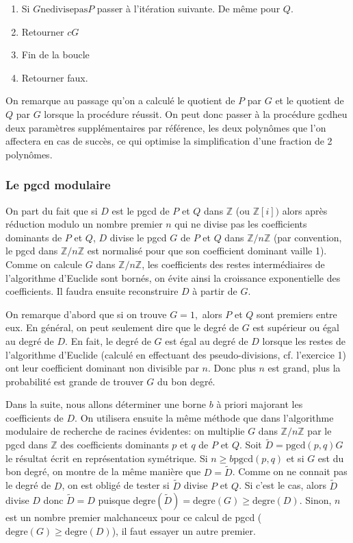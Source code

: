 \documentclass[a4paper,11pt]{article}
\begin{document}
\begin{giacjshere}
\begin{enumerate}
  \item Si $G \mbox{ne} \mbox{divise} \mbox{pas}$$P$ passer à l'itération
  suivante. De même pour $Q$.
  
  \item Retourner $c G$
  
  \item Fin de la boucle
  
  \item Retourner faux.
\end{enumerate}
On remarque au passage qu'on a calculé le quotient de $P$ par $G$ et le
quotient de $Q$ par $G$ lorsque la procédure réussit. On peut donc passer à la
procédure gcdheu deux paramètres supplémentaires par référence, les deux
polynômes que l'on affectera en cas de succès, ce qui optimise la
simplification d'une fraction de 2 polynômes.

\subsubsection{Le pgcd modulaire}

On part du fait que si $D$ est le pgcd de $P$ et $Q$ dans $\mathbb{Z}$ (ou
$\mathbb{Z} [ i ] )$ alors après réduction modulo un nombre premier $n$ qui ne
divise pas les coefficients dominants de $P$ et $Q$, $D$ divise le pgcd $G$ de
$P$ et $Q$ dans $\mathbb{Z} / n \mathbb{Z}$ (par convention, le pgcd dans
$\mathbb{Z} / n \mathbb{Z}$ est normalisé pour que son coefficient dominant
vaille 1). Comme on calcule $G$ dans $\mathbb{Z} / n \mathbb{Z}$, les
coefficients des restes intermédiaires de l'algorithme d'Euclide sont bornés,
on évite ainsi la croissance exponentielle des coefficients. Il faudra ensuite
reconstruire $D$ à partir de $G$.

On remarque d'abord que si on trouve $G = 1,$ alors $P$ et $Q$ sont premiers
entre eux. En général, on peut seulement dire que le degré de $G$ est
supérieur ou égal au degré de $D$. En fait, le degré de $G$ est égal au degré
de $D$ lorsque les restes de l'algorithme d'Euclide (calculé en effectuant des
pseudo-divisions, cf. l'exercice 1) ont leur coefficient dominant non
divisible par $n$. Donc plus $n$ est grand, plus la probabilité est grande de
trouver $G$ du bon degré.

Dans la suite, nous allons déterminer une borne $b$ à priori majorant 
les coefficients de
$D$. On utilisera ensuite la même méthode que dans l'algorithme modulaire de
recherche de racines évidentes: on multiplie $G$ dans $\mathbb{Z} / n
\mathbb{Z}$ par le pgcd dans $\mathbb{Z}$ des coefficients dominants $p$ et
$q$ de $P$ et $Q$. Soit $\tilde{D} = \mbox{pgcd} ( p, q ) G$ le résultat écrit
en représentation symétrique. Si $n \geq b \mbox{pgcd} ( p, q )$ et si
$G$ est du bon degré, on montre de la même manière que $D = \tilde{D}$. Comme 
on ne connait pas le degré de $D$, on est obligé de tester si $\tilde{D}$ 
divise $P$
et $Q$. Si c'est le cas, alors $\tilde{D}$ divise $D$ donc $\tilde{D} = D$
puisque $\mbox{degre} ( \tilde{D} ) = \mbox{degre} ( G ) \geq
\mbox{degre} ( D )$. Sinon, $n$ est un nombre premier malchanceux pour ce
calcul de pgcd ($\mbox{degre} ( G ) \geq \mbox{degre} ( D )$), il faut
essayer un autre premier.


\end{giacjshere}
\end{document}

